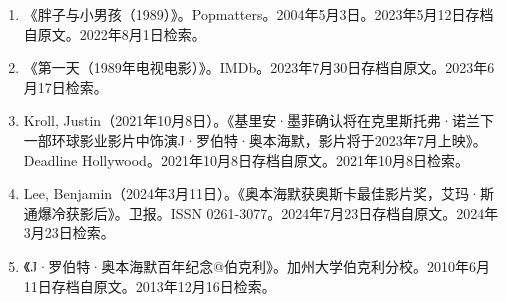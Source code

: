\begin{enumerate}
\item 《胖子与小男孩（1989）》。Popmatters。2004年5月3日。2023年5月12日存档自原文。2022年8月1日检索。
\item 《第一天（1989年电视电影）》。IMDb。2023年7月30日存档自原文。2023年6月17日检索。
\item Kroll, Justin（2021年10月8日）。《基里安·墨菲确认将在克里斯托弗·诺兰下一部环球影业影片中饰演J·罗伯特·奥本海默，影片将于2023年7月上映》。Deadline Hollywood。2021年10月8日存档自原文。2021年10月8日检索。
\item Lee, Benjamin（2024年3月11日）。《奥本海默获奥斯卡最佳影片奖，艾玛·斯通爆冷获影后》。卫报。ISSN 0261-3077。2024年7月23日存档自原文。2024年3月23日检索。
\item 《J·罗伯特·奥本海默百年纪念@伯克利》。加州大学伯克利分校。2010年6月11日存档自原文。2013年12月16日检索。
\end{enumerate}